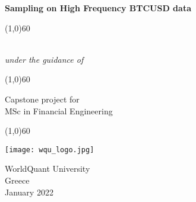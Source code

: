 \begin{titlepage}
	\begin{center}
		\vspace*{1cm}
		
		\Large
		\textbf{Sampling on High Frequency BTCUSD data}
		
		\vspace{1.5cm}
		
		\line(1,0){60} 
		
		\vspace{1.5cm}
		
		 \\ 
		\textit{under the guidance of} \\ 
		
		
		
		\vspace{1.5cm}
		
		\line(1,0){60} 
		
		\vspace{1.5cm}

		Capstone project for \\
		MSc in Financial Engineering 
		
		\vspace{1.5cm}
		
		\line(1,0){60} 
		
		\vspace{1.5cm}
		
		\texttt{[image: wqu\_logo.jpg]}	
				
		\vspace{2.5cm}		
		
		\Large
		WorldQuant University\\
		Greece\\
		January 2022
		
		
	\end{center}
\end{titlepage}
